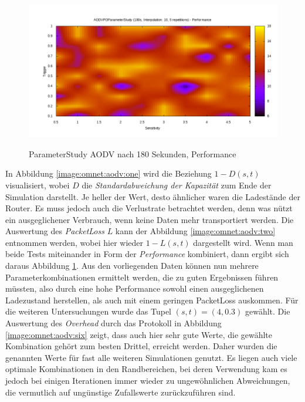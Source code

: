 \begin{figure}
  \centering
  \includegraphics[scale=0.45]{bilder/aps3.png} \\
  \caption{ParameterStudy AODV nach 180 Sekunden, Performance}
  \label{image:omnet:aodv:three}
\end{figure}

In Abbildung \ref{image:omnet:aodv:one} wird die Beziehung $1-D(s,t)$ visualisiert, wobei $D$ die \textit{Standardabweichung der Kapazität} zum Ende der Simulation darstellt. Je heller der Wert, desto ähnlicher waren die Ladestände der Router. Es muss jedoch auch die Verlustrate betrachtet werden, denn was nützt ein ausgeglichener Verbrauch, wenn keine Daten mehr transportiert werden. Die Auswertung des \textit{PacketLoss} $L$ kann der Abbildung \ref{image:omnet:aodv:two} entnommen werden, wobei hier wieder $1-L(s,t)$ dargestellt wird. Wenn man beide Tests miteinander in Form der \og \textit{Performance} kombiniert, dann ergibt sich daraus Abbildung \ref{image:omnet:aodv:three}. Aus den vorliegenden Daten können nun mehrere Parameterkombinationen ermittelt werden, die zu guten Ergebnissen führen müssten, also durch eine hohe Performance sowohl einen ausgeglichenen Ladezustand herstellen, als auch mit einem geringen PacketLoss auskommen. Für die weiteren Untersuchungen wurde das Tupel $(s,t) = (4,0.3)$ gewählt. Die Auswertung des \textit{Overhead} durch das Protokoll in Abbildung \ref{image:omnet:aodv:six} zeigt, dass auch hier sehr gute Werte, die gewählte Kombination gehört zum besten Drittel, erreicht werden. Daher wurden die genannten Werte für fast alle weiteren Simulationen genutzt. Es liegen auch viele optimale Kombinationen in den Randbereichen, bei deren Verwendung kam es jedoch bei einigen Iterationen immer wieder zu ungewöhnlichen Abweichungen, die vermutlich auf ungünstige Zufallswerte zurückzuführen sind.

